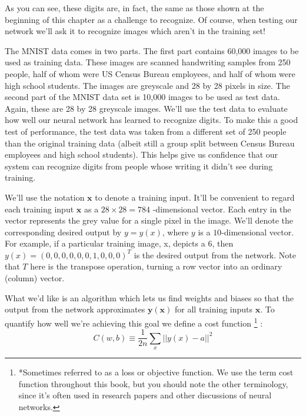 \documentclass[a4paper,12pt]{report}%
\begin{document}
As you can see, these digits are, in fact, the same as those shown at the beginning of this chapter as a challenge to recognize. Of course, when testing our network we'll ask it to recognize images which aren't in the training set!

The MNIST data comes in two parts. The first part contains 60,000 images to be used as training data. These images are scanned handwriting samples from 250 people, half of whom were US Census Bureau employees, and half of whom were high school students. The images are greyscale and 28 by 28 pixels in size. The second part of the MNIST data set is 10,000 images to be used as test data. Again, these are 28 by 28 greyscale images. We'll use the test data to evaluate how well our neural network has learned to recognize digits. To make this a good test of performance, the test data was taken from a different set of 250 people than the original training data (albeit still a group split between Census Bureau employees and high school students). This helps give us confidence that our system can recognize digits from people whose writing it didn't see during training.

We'll use the notation $\mathbf{x}$ to denote a training input. It'll be convenient to regard each training input $\mathbf{x}$ as a $28\times28=784$ -dimensional vector. Each entry in the vector represents the grey value for a single pixel in the image. We'll denote the corresponding desired output by $y=y(x)$, where $y$ is a $10$-dimensional vector. For example, if a particular training image, x, depicts a $6$, then $y(x)=(0,0,0,0,0,0,1,0,0,0)^{T}$ is the desired output from the network. Note that $T$ here is the transpose operation, turning a row vector into an ordinary (column) vector.

What we'd like is an algorithm which lets us find weights and biases so that the output from the network approximates $\mathbf{y(x)}$ for all training inputs $\mathbf{x}$. To quantify how well we're achieving this goal we define a cost function \footnote{\color{blue}*Sometimes referred to as a loss or objective function. We use the term cost function throughout this book, but you should note the other terminology, since it's often used in research papers and other discussions of neural networks.} :
\begin{equation}
 C(w,b) \equiv \frac{1}{2n} \sum_{x} || y(x)−a ||^{2}
\end{equation}

\smallskip
\end{document}
